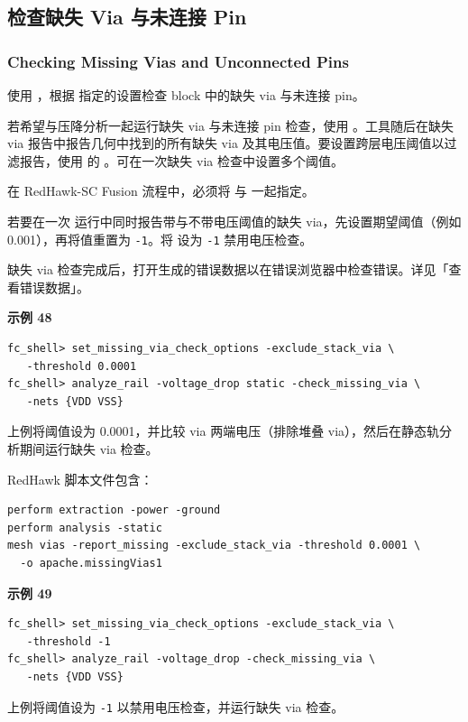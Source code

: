 \subsection{检查缺失 Via 与未连接 Pin}
\subsubsection*{Checking Missing Vias and Unconnected Pins}

使用  ，根据  指定的设置检查 block 中的缺失 via 与未连接 pin。

若希望与压降分析一起运行缺失 via 与未连接 pin 检查，使用 。工具随后在缺失 via 报告中报告几何中找到的所有缺失 via 及其电压值。要设置跨层电压阈值以过滤报告，使用  的 。可在一次缺失 via 检查中设置多个阈值。

\begin{noteBox}
在 RedHawk-SC Fusion 流程中，必须将  与  一起指定。
\end{noteBox}

若要在一次  运行中同时报告带与不带电压阈值的缺失 via，先设置期望阈值（例如 0.001），再将值重置为 \texttt{-1}。将  设为 \texttt{-1} 禁用电压检查。

缺失 via 检查完成后，打开生成的错误数据以在错误浏览器中检查错误。详见「查看错误数据」。

\textbf{示例 48}
\begin{lstlisting}
fc_shell> set_missing_via_check_options -exclude_stack_via \
   -threshold 0.0001
fc_shell> analyze_rail -voltage_drop static -check_missing_via \
   -nets {VDD VSS}
\end{lstlisting}
上例将阈值设为 0.0001，并比较 via 两端电压（排除堆叠 via），然后在静态轨分析期间运行缺失 via 检查。

RedHawk 脚本文件包含：
\begin{lstlisting}
perform extraction -power -ground
perform analysis -static
mesh vias -report_missing -exclude_stack_via -threshold 0.0001 \
  -o apache.missingVias1
\end{lstlisting}

\textbf{示例 49}
\begin{lstlisting}
fc_shell> set_missing_via_check_options -exclude_stack_via \
   -threshold -1
fc_shell> analyze_rail -voltage_drop -check_missing_via \
   -nets {VDD VSS}
\end{lstlisting}
上例将阈值设为 \texttt{-1} 以禁用电压检查，并运行缺失 via 检查。

